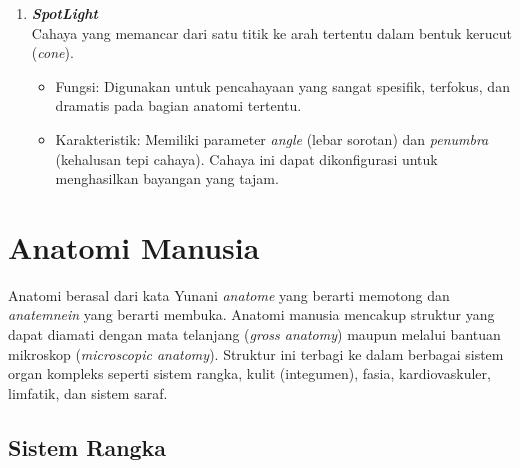 \begin{enumerate}
    \item \textbf{\textit{SpotLight}} \\
    Cahaya yang memancar dari satu titik ke arah tertentu dalam bentuk kerucut (\textit{cone}).
    \begin{itemize}
        \item Fungsi: Digunakan untuk pencahayaan yang sangat spesifik, terfokus, dan dramatis pada bagian anatomi tertentu.
        \item Karakteristik: Memiliki parameter \textit{angle} (lebar sorotan) dan \textit{penumbra} (kehalusan tepi cahaya). Cahaya ini dapat dikonfigurasi untuk menghasilkan bayangan yang tajam.
    \end{itemize}
    
\end{enumerate}



\section{Anatomi Manusia }
\label{sec:anatomi_manusia}

Anatomi berasal dari kata Yunani \textit{anatome} yang berarti memotong dan \textit{anatemnein} yang berarti membuka. Anatomi manusia mencakup struktur yang dapat diamati dengan mata telanjang (\textit{gross anatomy}) maupun melalui bantuan mikroskop (\textit{microscopic anatomy}). Struktur ini terbagi ke dalam berbagai sistem organ kompleks seperti sistem rangka, kulit (integumen), fasia, kardiovaskuler, limfatik, dan sistem saraf. ~\cite{richard:12:grays}

\subsection{Sistem Rangka}
\label{subsec:sistem_rangka}

